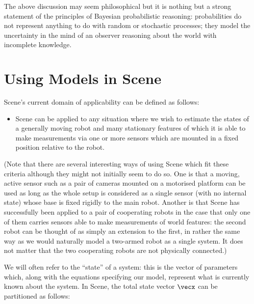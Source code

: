 \documentclass{article}
\begin{document}
The above discussion may seem philosophical but it is nothing but a
strong statement of the principles of Bayesian probabilistic
reasoning: probabilities do not represent anything to do with random
or stochastic processes; they model the uncertainty in the mind of an
observer reasoning about the world with incomplete knowledge.

\section{Using Models in Scene}

Scene's current domain of applicability can be defined as follows:
\begin{itemize}
\item Scene can be applied to any situation where we wish to estimate
  the states of a generally moving robot and many stationary features
  of which it is able to make measurements via one or more sensors
  which are mounted in a fixed position relative to the robot.
\end{itemize}

(Note that there are several interesting ways of using Scene which fit
these criteria although they might not initially seem to do so. One is
that a moving, active sensor such as a pair of cameras mounted on a
motorised platform can be used as long as the whole setup is
considered as a single sensor (with no internal state) whose base is
fixed rigidly to the main robot. Another is that Scene has
successfully been applied to a pair of cooperating robots in the case
that only one of them carries sensors able to make measurements of
world features: the second robot can be thought of as simply an
extension to the first, in rather the same way as we would naturally
model a two-armed robot as a single system. It does not matter that
the two cooperating robots are not physically connected.)


We will often refer to the ``state'' of a system: this is the vector
of parameters which, along with the equations specifying our model,
represent what is currently known about the system. In Scene, the
total state vector $\vecx$ can be partitioned as follows:
\end{document}
